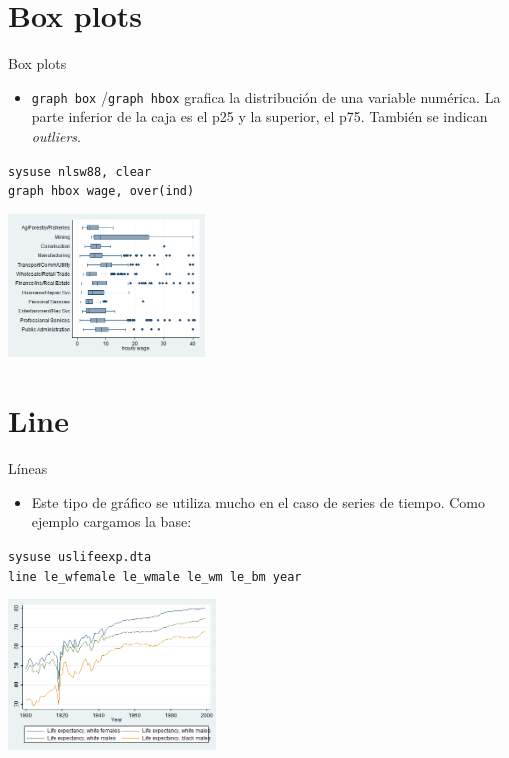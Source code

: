 \documentclass{beamer}
\begin{document}
\section{Box plots}
\begin{frame}{Box plots}
\begin{itemize}
\item \texttt{graph box} /\texttt{graph hbox} grafica la distribución de una variable numérica. La parte inferior de la caja es el p25 y la superior, el p75. También se indican \textit{outliers}.
\end{itemize}
{\footnotesize \texttt{sysuse nlsw88, clear}}\\
{\footnotesize \texttt{graph hbox wage, over(ind)}}\\\medskip
\centerline{\includegraphics[height=3.8cm]{box.png}}
\end{frame}

\section{Line}

\begin{frame}{Líneas}
\begin{itemize}
\item Este tipo de gráfico se utiliza mucho en el caso de series de tiempo. Como ejemplo cargamos la base:
\end{itemize}
{\footnotesize \texttt{sysuse uslifeexp.dta}}\\
{\footnotesize \texttt{line le\_wfemale le\_wmale le\_wm le\_bm year}}\\\medskip
\centerline{\includegraphics[height=4cm]{line.png}}
\end{frame}
\end{document}
